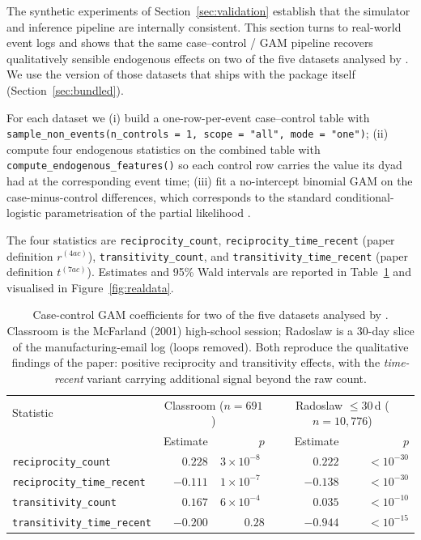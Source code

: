 \documentclass[11pt,a4paper]{article}
\begin{document}
The synthetic experiments of Section~\ref{sec:validation} establish
that the simulator and inference pipeline are internally consistent.
This section turns to real-world event logs and shows that the same
case--control / GAM pipeline recovers qualitatively sensible
endogenous effects on two of the five datasets analysed by
\citet{juozaitiene2024about}.  We use the version of those datasets
that ships with the package itself
(Section~\ref{sec:bundled}).

For each dataset we (i) build a one-row-per-event case--control table
with \texttt{sample\_non\_events(n\_controls = 1, scope = "all",
mode = "one")}; (ii) compute four endogenous statistics on the
combined table with \texttt{compute\_endogenous\_features()} so each
control row carries the value its dyad had at the corresponding event
time; (iii) fit a no-intercept binomial GAM on the case-minus-control
differences, which corresponds to the standard conditional-logistic
parametrisation of the partial likelihood
\citep{juozaitiene2024about,vu2017relational}.

The four statistics are
\texttt{reciprocity\_count},
\texttt{reciprocity\_time\_recent} (paper definition $r^{(4ac)}$),
\texttt{transitivity\_count}, and
\texttt{transitivity\_time\_recent} (paper definition $t^{(7ac)}$).
Estimates and 95\% Wald intervals are reported in
Table~\ref{tab:realdata} and visualised in
Figure~\ref{fig:realdata}.

\begin{table}[h]
\centering
\small
\begin{tabular}{lrrrr}
\toprule
Statistic & \multicolumn{2}{c}{Classroom ($n{=}691$)} &
            \multicolumn{2}{c}{Radoslaw $\le 30$\,d ($n{=}10{,}776$)} \\
          & Estimate & $p$ & Estimate & $p$ \\
\midrule
\texttt{reciprocity\_count}        &  $\phantom{-}0.228$ & $3{\times}10^{-8\phantom{0}}$ & $\phantom{-}0.222$ & $<10^{-30}$ \\
\texttt{reciprocity\_time\_recent} &  $-0.111$           & $1{\times}10^{-7\phantom{0}}$ & $-0.138$           & $<10^{-30}$ \\
\texttt{transitivity\_count}       &  $\phantom{-}0.167$ & $6{\times}10^{-4\phantom{0}}$ & $\phantom{-}0.035$ & $<10^{-10}$ \\
\texttt{transitivity\_time\_recent}&  $-0.200$           & $0.28$                       & $-0.944$           & $<10^{-15}$ \\
\bottomrule
\end{tabular}
\caption{Case-control GAM coefficients for two of the five datasets
analysed by \citet{juozaitiene2024about}.  Classroom is the McFarland
(2001) high-school session; Radoslaw is a 30-day slice
of the \citet{michalski2014radoslaw} manufacturing-email log (loops
removed).  Both reproduce the qualitative findings of the paper:
positive reciprocity and transitivity effects, with the
\emph{time-recent} variant carrying additional signal beyond the raw
count.}
\label{tab:realdata}
\end{table}
\end{document}
